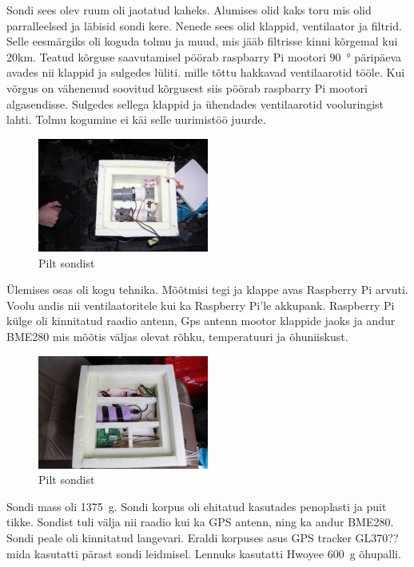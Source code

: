 \documentclass{trkut}%
\begin{document}
Sondi sees olev ruum oli jaotatud kaheks. Alumises olid kaks toru mis olid parralleelsed ja läbisid sondi kere. Nenede sees olid klappid, ventilaator ja filtrid. Selle eesmärgiks oli koguda tolmu ja muud, mis jääb filtrisse kinni kõrgemal kui 20km. Teatud kõrguse saavutamisel pöörab raspbarry Pi mootori \SI{90}{\degree} päripäeva avades nii klappid ja sulgedes lüliti. mille tõttu hakkavad ventilaarotid tööle. Kui võrgus on vähenenud soovitud kõrgusest siis pöörab raspbarry Pi mootori algasendisse. Sulgedes sellega klappid ja ühendades ventilaarotid vooluringist lahti. Tolmu kogumine ei käi selle uurimistöö juurde.

\begin{figure}[h]
	\includegraphics[width=0.5\textwidth]{PicGra/sond2korrus.jpg}
	\caption{Pilt sondist}
	\label{sond}
\end{figure}

Ülemises osas oli kogu tehnika. Mõõtmisi tegi ja klappe avas Raspberry Pi arvuti. Voolu andis nii ventilaatoritele kui ka Raspberry Pi'le akkupank. Raspberry Pi külge oli kinnitatud raadio antenn, Gps antenn mootor klappide jaoks ja andur BME280 mis mõõtis väljas olevat rõhku, temperatuuri ja õhuniiskust.

\begin{figure}[h]
	\includegraphics[width=0.5\textwidth]{PicGra/sond1korrus1.jpg}
	\caption{Pilt sondist}
	\label{sond}
\end{figure}

Sondi mass oli \SI{1375}{g}. Sondi korpus oli ehitatud kasutades penoplasti ja puit tikke. Sondist tuli välja nii raadio kui ka GPS antenn, ning ka andur BME280. Sondi peale oli kinnitatud langevari. Eraldi korpuses asus GPS tracker GL370?? mida kasutatti pärast sondi leidmisel. Lennuks kasutatti Hwoyee \SI{600}{g} õhupalli.
\end{document}
